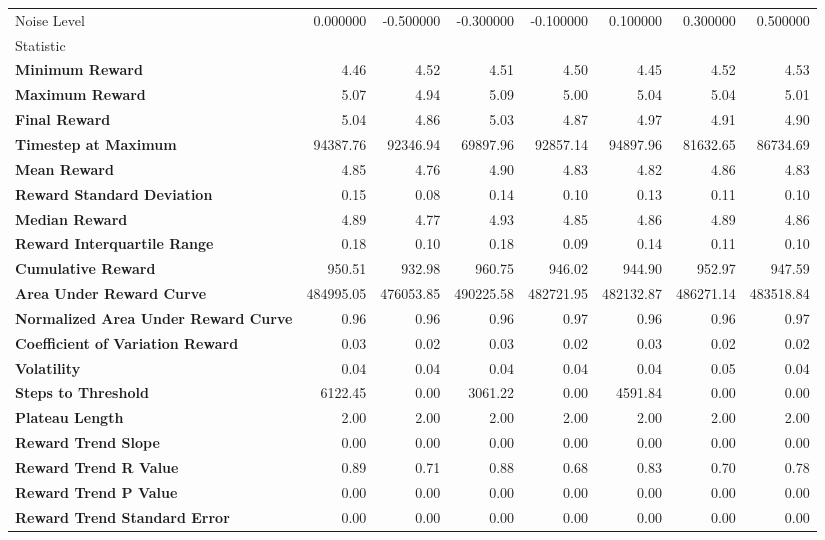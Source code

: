 \begin{tabular}{lrrrrrrr}
\toprule
Noise Level & 0.000000 & -0.500000 & -0.300000 & -0.100000 & 0.100000 & 0.300000 & 0.500000 \\
Statistic &  &  &  &  &  &  &  \\
\midrule
\textbf{Minimum Reward} & 4.46 & 4.52 & 4.51 & 4.50 & 4.45 & 4.52 & 4.53 \\
\textbf{Maximum Reward} & 5.07 & 4.94 & 5.09 & 5.00 & 5.04 & 5.04 & 5.01 \\
\textbf{Final Reward} & 5.04 & 4.86 & 5.03 & 4.87 & 4.97 & 4.91 & 4.90 \\
\textbf{Timestep at Maximum} & 94387.76 & 92346.94 & 69897.96 & 92857.14 & 94897.96 & 81632.65 & 86734.69 \\
\textbf{Mean Reward} & 4.85 & 4.76 & 4.90 & 4.83 & 4.82 & 4.86 & 4.83 \\
\textbf{Reward Standard Deviation} & 0.15 & 0.08 & 0.14 & 0.10 & 0.13 & 0.11 & 0.10 \\
\textbf{Median Reward} & 4.89 & 4.77 & 4.93 & 4.85 & 4.86 & 4.89 & 4.86 \\
\textbf{Reward Interquartile Range} & 0.18 & 0.10 & 0.18 & 0.09 & 0.14 & 0.11 & 0.10 \\
\textbf{Cumulative Reward} & 950.51 & 932.98 & 960.75 & 946.02 & 944.90 & 952.97 & 947.59 \\
\textbf{Area Under Reward Curve} & 484995.05 & 476053.85 & 490225.58 & 482721.95 & 482132.87 & 486271.14 & 483518.84 \\
\textbf{Normalized Area Under Reward Curve} & 0.96 & 0.96 & 0.96 & 0.97 & 0.96 & 0.96 & 0.97 \\
\textbf{Coefficient of Variation Reward} & 0.03 & 0.02 & 0.03 & 0.02 & 0.03 & 0.02 & 0.02 \\
\textbf{Volatility} & 0.04 & 0.04 & 0.04 & 0.04 & 0.04 & 0.05 & 0.04 \\
\textbf{Steps to Threshold} & 6122.45 & 0.00 & 3061.22 & 0.00 & 4591.84 & 0.00 & 0.00 \\
\textbf{Plateau Length} & 2.00 & 2.00 & 2.00 & 2.00 & 2.00 & 2.00 & 2.00 \\
\textbf{Reward Trend Slope} & 0.00 & 0.00 & 0.00 & 0.00 & 0.00 & 0.00 & 0.00 \\
\textbf{Reward Trend R Value} & 0.89 & 0.71 & 0.88 & 0.68 & 0.83 & 0.70 & 0.78 \\
\textbf{Reward Trend P Value} & 0.00 & 0.00 & 0.00 & 0.00 & 0.00 & 0.00 & 0.00 \\
\textbf{Reward Trend Standard Error} & 0.00 & 0.00 & 0.00 & 0.00 & 0.00 & 0.00 & 0.00 \\

\end{tabular}

